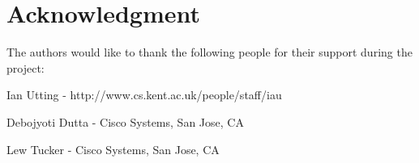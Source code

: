 \documentclass[10pt, a4paper, conference, compsocconf]{IEEEtran}
\begin{document}

















\section*{Acknowledgment}
The authors would like to thank the following people for their support during
the project:

Ian Utting - http://www.cs.kent.ac.uk/people/staff/iau

Debojyoti Dutta - Cisco Systems, San Jose, CA

Lew Tucker - Cisco Systems, San Jose, CA


\end{document}
